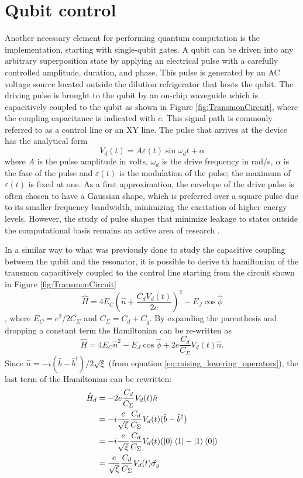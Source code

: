 \section{Qubit control}
Another necessary element for performing quantum computation is the implementation, starting with single-qubit gates. 
A qubit can be driven into any arbitrary superposition state by applying an electrical pulse with a carefully controlled amplitude, duration, and phase.
This pulse is generated by an AC voltage source located outside the dilution refrigerator that hosts the qubit.
The driving pulse is brought to the qubit by an on-chip waveguide which is capacitively coupled to the qubit as shown in Figure \ref{fig:TransmonCircuit}, where the coupling capacitance is indicated with $c$.
This signal path is commonly referred to as a control line or an XY line. The pulse that arrives at the device has the analytical form
\begin{equation}\label{eq:drive_pulse}
    V_d(t) = A\varepsilon(t)\sin{\omega_d t + \alpha}
\end{equation}
where $A$ is the pulse amplitude in volts, $\omega_d$ is the drive frequency in rad/s, $\alpha$ is the fase of the pulse and $\varepsilon(t)$ is the modulation of the pulse; the maximum of $\varepsilon(t)$ is fixed at one.
As a first approximation, the envelope of the drive pulse is often chosen to have a Gaussian shape, which is preferred over a square pulse due to its smaller frequency bandwidth, minimizing the excitation of higher energy levels.
However, the study of pulse shapes that minimize leakage to states outside the computational basis remains an active area of research \cite{chiaro2025activeleakagecancellationsingle}.

In a similar way to what was previously done to study the capacitive coupling between the qubit and the resonator, it is possible to derive th hamiltonian of the transmon capacitively coupled to the control line starting from the circuit shown in Figure \ref{fig:TransmonCircuit}
\begin{equation}
    \hat{H} = 4E_C(\hat{n} + \frac{C_d V_d(t)}{2e})^2 - E_J \cos{\hat{\phi}}
\end{equation}, 
where $E_C = e^2/2C_\Sigma$ and $C_\Sigma =  C_d + C_q$. By expanding the parenthesis and dropping a constant term the Hamiltonian can be re-written as
\begin{equation}\label{eq:tmp}
    \hat{H} =  4E_C\hat{n}^2 -E_J\cos{\hat{\phi}} + 2e\frac{C_d}{C_\Sigma}V_d(t)\hat{n}.
\end{equation}
Since $\hat{n} = -i(\hat{b}-\hat{b}^\dagger)/2\sqrt{\xi}$ (from equation \ref{eq:raising_lowering_operators}), the last term of the Hamiltonian can be rewritten:
\begin{align}\label{eq:misto}
    \hat{H}_d &= -2e\frac{C_d}{C_\Sigma}V_d(t)\hat{n}\\
    &=-i\frac{e}{\sqrt{\xi}}\frac{C_d}{C_{\Sigma}}V_d(t)(\hat{b}-\hat{b}^\dagger)\\
    &=-i\frac{e}{\sqrt{\xi}}\frac{C_d}{C_{\Sigma}}V_d(t)(\ket{0}\bra{1}-\ket{1}\bra{0})\\
    &=\frac{e}{\sqrt{\xi}}\frac{C_d}{C_{\Sigma}}V_d(t)\hat{\sigma_y}
\end{align}

